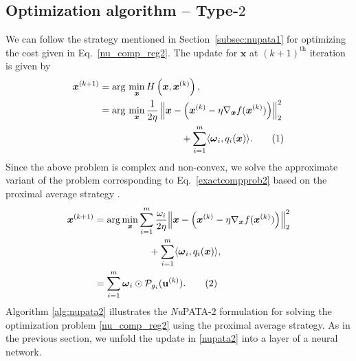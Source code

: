 \documentclass[journal]{IEEEtran}
\newcommand{\argminA}{\arg\,\min}
\newcommand\numberthis{\addtocounter{equation}{1}\tag{\theequation}}
\begin{document}
\subsection{Optimization algorithm -- Type-\texorpdfstring{$2$}{2}}
\label{subsec:nupata2}

We can follow the strategy mentioned in Section~\ref{subsec:nupata1} for optimizing the cost given in Eq.~\eqref{nu_comp_reg2}.
The update for $\boldsymbol{x}$ at $(k+1)^{\text{th}}$ iteration is given by 
\begin{align*}
\boldsymbol{x}^{(k+1)} & = \argminA_{\boldsymbol{x}} H \left( \boldsymbol{x},\boldsymbol{x}^{(k)} \right), \\
 & = \argminA_{\boldsymbol{x}} \frac{1}{2 \eta} \left\|\boldsymbol{x} - \left( \boldsymbol{x}^{(k)}- \eta\nabla_{\boldsymbol{x}} f(\boldsymbol{x}^{(k)}) \right) \right\|_{2}^{2} \\ & \hspace{3cm} + \sum\limits_{i = 1}^m \langle \boldsymbol{\omega}_i, q_i(\boldsymbol{x})\rangle. \numberthis \label{exactcompprob2}
\end{align*}
Since the above problem is complex and non-convex, we solve the approximate variant of the problem corresponding to Eq.~\eqref{exactcompprob2} based on the proximal average strategy \cite{yu2013better}.
\begin{align*}
\boldsymbol{x}^{(k+1)} 
 & = \arg\min_{\boldsymbol{x}} \sum\limits_{i = 1}^m \frac{\omega_{i}}{2 \eta} {\left\| \boldsymbol{x} -\left( \boldsymbol{x}^{(k)}- \eta\nabla_{\boldsymbol{x}} f(\boldsymbol{x}^{(k)}) \right) \right\|}_{2}^{2} \\
 & \hspace{2cm} + \sum\limits_{i = 1}^m \langle \boldsymbol{\omega}_i, q_i(\boldsymbol{x})\rangle,\\
 & = \sum\limits_{i=1}^m \boldsymbol{\omega}_i \odot \mathcal{P}_{g_i}(\mathbf{u}^{(k)}) . \numberthis \label{nupata2}
\end{align*}
Algorithm \eqref{alg:nupata2} illustrates the {\it Nu}PATA-$2$ formulation for solving the optimization problem \eqref{nu_comp_reg2} using the proximal average strategy. As in the previous section, we unfold the update in \eqref{nupata2} into a layer of a neural network.
\end{document}
